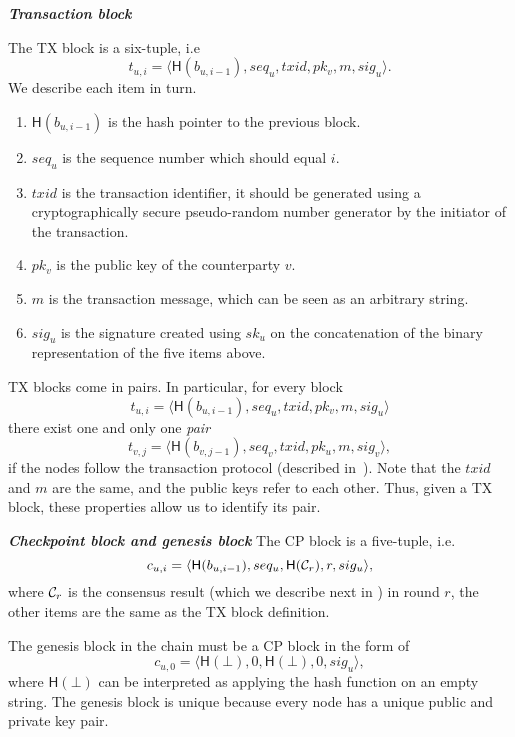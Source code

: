 \begin{definition}
\textbf{\emph{Transaction block}}

The TX block is a six-tuple, i.e
$$t_{u, i} = \langle \textsf{H}(b_{u, i - 1}), seq_u, txid, pk_v, m, sig_u \rangle.$$
We describe each item in turn.
\begin{enumerate}
\item $\textsf{H}(b_{u, i - 1})$ is the hash pointer to the previous block.
\item $seq_u$ is the sequence number which should equal $i$.
\item $txid$ is the transaction identifier, it should be generated using a cryptographically secure pseudo-random number generator by the initiator of the transaction.
\item $pk_v$ is the public key of the counterparty $v$.
\item $m$ is the transaction message,
    which can be seen as an arbitrary string.
\item $sig_u$ is the signature created using $sk_u$ on the concatenation of the binary representation of the five items above.
\end{enumerate}

TX blocks come in pairs.
In particular, for every block 
$$t_{u, i} = \langle \textsf{H}(b_{u, i - 1}), seq_u, txid, pk_v, m, sig_u \rangle$$
there exist one and only one \emph{pair} 
$$t_{v, j} = \langle \textsf{H}(b_{v, j - 1}), seq_v, txid, pk_u, m, sig_v \rangle,$$
if the nodes follow the transaction protocol (described in~).
Note that the $txid$ and $m$ are the same, and the public keys refer to each other.
Thus, given a TX block, these properties allow us to identify its pair.
\end{definition}


\begin{definition}
\textbf{\emph{Checkpoint block and genesis block}}
The CP block is a five-tuple, i.e. 
$$c_{u, i} = \langle \textsf{H}(b_{u, i-1}), seq_u, \textsf{H}(\mathcal{C}_r), r, sig_u \rangle,$$
where $\mathcal{C}_r$ is the consensus result (which we describe next in ) in round $r$,
the other items are the same as the TX block definition.

The genesis block in the chain must be a CP block in the form of
$$c_{u, 0} = \langle \textsf{H}(\bot), 0,  \textsf{H}(\bot), 0, sig_u \rangle,$$
where $\textsf{H}(\bot)$ can be interpreted as applying the hash function on an empty string.
The genesis block is unique because every node has a unique public and private key pair.
\end{definition}

